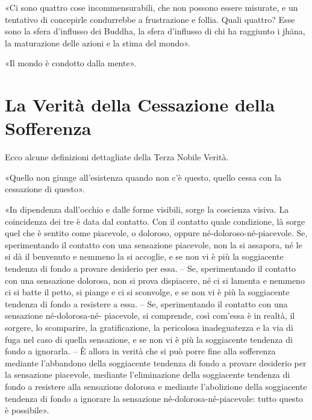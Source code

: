 

«Ci sono quattro cose incommensurabili, che non possono essere misurate,
e un tentativo di concepirle condurrebbe a frustrazione e follia. Quali
quattro? Esse sono la sfera d’influsso dei Buddha, la sfera d’influsso
di chi ha raggiunto i jhāna, la maturazione delle azioni e la stima del
mondo».




«Il mondo è condotto dalla mente».




\hypertarget{x-la-verità-della-cessazione-della-sofferenza}{\section*{La Verità della Cessazione della Sofferenza}}
 Ecco alcune definizioni dettagliate della Terza
Nobile Verità.


 «Quello non giunge all’esistenza quando non c’è questo,
quello cessa con la cessazione di questo».




«In dipendenza dall’occhio e dalle forme visibili, sorge la coscienza
visiva. La coincidenza dei tre è data dal contatto. Con il contatto
quale condizione, là sorge quel che è sentito come piacevole, o
doloroso, oppure né-doloroso-né-piacevole. Se, sperimentando il contatto
con una sensazione piacevole, non la si assapora, né le si dà il
benvenuto e nemmeno la si accoglie, e se non vi è più la soggiacente
tendenza di fondo a provare desiderio per essa. – Se, sperimentando il
contatto con una sensazione dolorosa, non si prova dispiacere, né ci si
lamenta e nemmeno ci si batte il petto, si piange e ci si sconvolge, e
se non vi è più la soggiacente tendenza di fondo a resistere a essa. –
Se, sperimentando il contatto con una sensazione né-dolorosa-né-
piacevole, si comprende, così com’essa è in realtà, il sorgere, lo
scomparire, la gratificazione, la pericolosa inadeguatezza e la via di
fuga nel caso di quella sensazione, e se non vi è più la soggiacente
tendenza di fondo a ignorarla. – È allora in verità che si può porre
fine alla sofferenza mediante l’abbandono della soggiacente tendenza di
fondo a provare desiderio per la sensazione piacevole, mediante
l’eliminazione della soggiacente tendenza di fondo a resistere alla
sensazione dolorosa e mediante l’abolizione della soggiacente tendenza
di fondo a ignorare la sensazione né-dolorosa-né-piacevole: tutto questo
è possibile».


